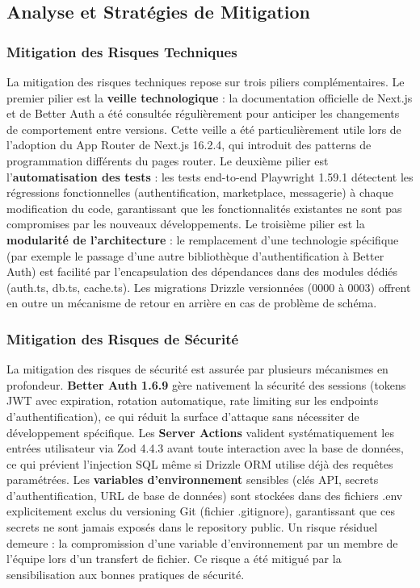 \subsection{Analyse et Stratégies de Mitigation}

\subsubsection{Mitigation des Risques Techniques}

La mitigation des risques techniques repose sur trois piliers complémentaires. Le premier pilier est la \textbf{veille technologique} : la documentation officielle de Next.js et de Better Auth a été consultée régulièrement pour anticiper les changements de comportement entre versions. Cette veille a été particulièrement utile lors de l'adoption du App Router de Next.js 16.2.4, qui introduit des patterns de programmation différents du pages router. Le deuxième pilier est l'\textbf{automatisation des tests} : les tests end-to-end Playwright 1.59.1 détectent les régressions fonctionnelles (authentification, marketplace, messagerie) à chaque modification du code, garantissant que les fonctionnalités existantes ne sont pas compromises par les nouveaux développements. Le troisième pilier est la \textbf{modularité de l'architecture} : le remplacement d'une technologie spécifique (par exemple le passage d'une autre bibliothèque d'authentification à Better Auth) est facilité par l'encapsulation des dépendances dans des modules dédiés (auth.ts, db.ts, cache.ts). Les migrations Drizzle versionnées (0000 à 0003) offrent en outre un mécanisme de retour en arrière en cas de problème de schéma.

\subsubsection{Mitigation des Risques de Sécurité}

La mitigation des risques de sécurité est assurée par plusieurs mécanismes en profondeur. \textbf{Better Auth 1.6.9} gère nativement la sécurité des sessions (tokens JWT avec expiration, rotation automatique, rate limiting sur les endpoints d'authentification), ce qui réduit la surface d'attaque sans nécessiter de développement spécifique. Les \textbf{Server Actions} valident systématiquement les entrées utilisateur via Zod 4.4.3 avant toute interaction avec la base de données, ce qui prévient l'injection SQL même si Drizzle ORM utilise déjà des requêtes paramétrées. Les \textbf{variables d'environnement} sensibles (clés API, secrets d'authentification, URL de base de données) sont stockées dans des fichiers .env explicitement exclus du versioning Git (fichier .gitignore), garantissant que ces secrets ne sont jamais exposés dans le repository public. Un risque résiduel demeure : la compromission d'une variable d'environnement par un membre de l'équipe lors d'un transfert de fichier. Ce risque a été mitigué par la sensibilisation aux bonnes pratiques de sécurité.

